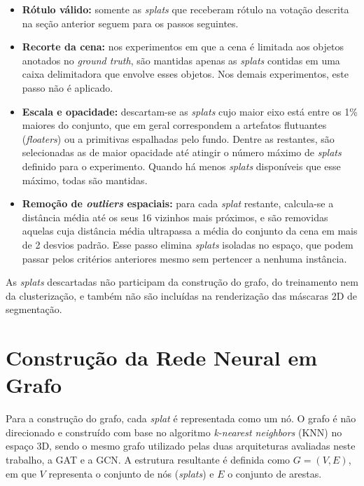 \begin{itemize}
    \item \textbf{Rótulo válido:} somente as \emph{splats} que receberam rótulo na votação descrita na seção anterior seguem para os passos seguintes.

    \item \textbf{Recorte da cena:} nos experimentos em que a cena é limitada aos objetos anotados no \textit{ground truth}, são mantidas apenas as \emph{splats} contidas em uma caixa delimitadora que envolve esses objetos. Nos demais experimentos, este passo não é aplicado.

    \item \textbf{Escala e opacidade:} descartam-se as \emph{splats} cujo maior eixo está entre os 1\% maiores do conjunto, que em geral correspondem a artefatos flutuantes (\textit{floaters}) ou a primitivas espalhadas pelo fundo. Dentre as restantes, são selecionadas as de maior opacidade até atingir o número máximo de \emph{splats} definido para o experimento. Quando há menos \emph{splats} disponíveis que esse máximo, todas são mantidas.

    \item \textbf{Remoção de \textit{outliers} espaciais:} para cada \emph{splat} restante, calcula-se a distância média até os seus 16 vizinhos mais próximos, e são removidas aquelas cuja distância média ultrapassa a média do conjunto da cena em mais de 2 desvios padrão. Esse passo elimina \emph{splats} isoladas no espaço, que podem passar pelos critérios anteriores mesmo sem pertencer a nenhuma instância.
\end{itemize}

 As \emph{splats} descartadas não participam da construção do grafo, do treinamento nem da clusterização, e também não são incluídas na renderização das máscaras 2D de segmentação.

\section{Construção da Rede Neural em Grafo}

Para a construção do grafo, cada \emph{splat} é representada como um nó. O grafo é não direcionado e construído com base no algoritmo \textit{k-nearest neighbors} (KNN) no espaço 3D, sendo o mesmo grafo utilizado pelas duas arquiteturas avaliadas neste trabalho, a GAT e a GCN. A estrutura resultante é definida como $G = (V, E)$, em que $V$ representa o conjunto de nós (\emph{splats}) e $E$ o conjunto de arestas.

